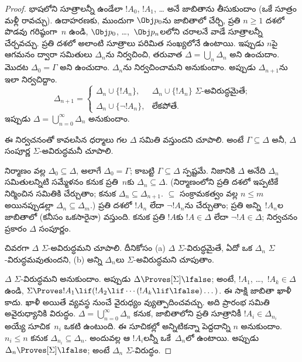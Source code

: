 \documentclass[../../../include/open-logic-section]{subfiles}
\begin{document}
\begin{proof}
భాషలోని సూత్రాలన్నీ ఉండేలా $!A_0$, $!A_1$, \dots{} అనే
జాబితాను తీసుకుందాం (ఒకే సూత్రం మళ్లీ రావచ్చు). ఉదాహరణకు,
ముందుగా $\Obj p_0$ను జాబితాలో చేర్చి, ప్రతి $n \ge 1$
దశలో పొడవు గరిష్ఠంగా~$n$ ఉండి, $\Obj p_0$,
\dots,~$\Obj p_n$లలోని చరాలనే వాడే సూత్రాలన్నీ చేర్చవచ్చు.
ప్రతి దశలో అలాంటి సూత్రాలు పరిమిత సంఖ్యలోనే ఉంటాయి.
ఇప్పుడు $n$పై ఆగమనం ద్వారా 
సమితులు $\Delta_n$ను నిర్వచించి, తరువాత $\Delta = \bigcup_n
\Delta_n$ అని ఉంచుదాం. మొదట $\Delta_0 = \Gamma$ అని
ఉంచుదాం. $\Delta_n$ను నిర్వచించామని అనుకుందాం.
అప్పుడు $\Delta_{n+1}$ను ఇలా నిర్వచిద్దాం.
\[
\Delta_{n+1} =
\begin{cases}
  \Delta_n \cup \{!A_n\}, & \text{$\Delta_n \cup \{ !A_n\}$
    $\Sigma$-అవిరుద్ధమైతే;} \\
  \Delta_n \cup \{ \lnot !A_n\}, & \text{లేకపోతే.}
\end{cases}
\]
ఇప్పుడు $\Delta = \bigcup_{n=0}^\infty \Delta_n$ అనుకుందాం.

ఈ నిర్వచనంతో కావలసిన ధర్మాలు గల $\Delta$ సమితి వస్తుందని
చూపాలి. అంటే $\Gamma \subseteq \Delta$ అనీ, $\Delta$
సంపూర్ణ $\Sigma$-అవిరుద్ధమనీ చూపాలి.

నిర్మాణం వల్ల $\Delta_0 \subseteq \Delta$, అలాగే
$\Delta_0 = \Gamma$; కాబట్టి $\Gamma \subseteq \Delta$
స్పష్టమే. నిజానికి $\Delta$ అనేది $\Delta_n$ సమితులన్నిటి సమ్మేళనం
కనుక ప్రతి~$n$కు $\Delta_n \subseteq \Delta$. (నిర్మాణంలోని
ప్రతి దశలో ఇప్పటికే నిర్మించిన సమితికి
 చేర్చుతాం; కనుక
$\Delta_n \subseteq \Delta_{n+1}$. $\subseteq$ సంక్రామకత్వం
వల్ల $n \le m$ అయినప్పుడల్లా $\Delta_n \subseteq
\Delta_{m}$.) ప్రతి దశలో $!A_n$ లేదా $\lnot !A_n$ను
చేర్చుతాం; ప్రతి  అన్ని~$!A_n$ల
జాబితాలో (కనీసం ఒకసారైనా) వస్తుంది. కనుక ప్రతి $!A$కు
$!A \in \Delta$ లేదా $\lnot !A \in \Delta$; నిర్వచనం
ప్రకారం $\Delta$ సంపూర్ణం.

చివరగా $\Delta$ $\Sigma$-అవిరుద్ధమని చూపాలి. దీనికోసం
(a) $\Delta$ $\Sigma$-విరుద్ధమైతే, ఏదో ఒక $\Delta_n$
$\Sigma$-విరుద్ధమవుతుందని, (b) అన్ని $\Delta_n$లు
$\Sigma$-అవిరుద్ధమని చూపుతాం.

$\Delta$ $\Sigma$-విరుద్ధమని అనుకుందాం. అప్పుడు $\Delta
\Proves[\Sigma] \lfalse$; అంటే, $!A_1$, \dots,~$!A_k \in
\Delta$ ఉండి, $\Sigma \Proves !A_1 \lif (!A_2 \lif \cdots (!A_k
\lif \lfalse)\dots)$. ఈ సాక్షి జాబితా ఖాళీ కాదు. ఖాళీ అయితే
వ్యవస్థ నుంచే వైరుధ్యం వ్యుత్పాదించవచ్చు. అది ప్రారంభ సమితి
అవైరుధ్యానికి విరుద్ధం. $\Delta = \bigcup_{n=0}^\infty \Delta_n$
కనుక, జాబితాలోని ప్రతి సూత్రానికీ $!A_i \in \Delta_{n_i}$ అయ్యే సూచిక~$n_i$ ఒకటి ఉంటుంది.
ఈ సూచికల్లో అన్నిటికన్నా పెద్దదాన్ని $n$ అనుకుందాం. $n_i \le n$ కనుక
$\Delta_{n_i} \subseteq \Delta_n$. అందువల్ల ఆ $!A_i$లన్నీ
ఒకే~$\Delta_n$లో ఉంటాయి. అప్పుడు $\Delta_n
\Proves[\Sigma] \lfalse$; అంటే $\Delta_n$ $\Sigma$-విరుద్ధం.


\end{proof}
\end{document}
